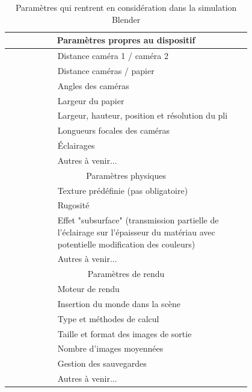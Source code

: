 \documentclass[a4paper, 11pt]{article}
\begin{document}
		\begin{table}
			\begin{tabular}{|r @{$\quad\rightarrow\quad$} p{0.8\linewidth}|}
				\hline
				\multicolumn{2}{|c|}{Paramètres propres au dispositif}  \\ \hline
				& Distance caméra 1 / caméra 2 \\
				& Distance caméras / papier \\
				& Angles des caméras \\
				& Largeur du papier \\
				& Largeur, hauteur, position et résolution du pli \\
				& Longueurs focales des caméras \\
				& \'Eclairages \\
				& Autres à venir... \\ \hline
				\multicolumn{2}{|c|}{Paramètres physiques} \\ \hline
				& Texture prédéfinie (pas obligatoire) \\
				& Rugosité \\
				& Effet "subsurface" (transmission partielle de l'éclairage sur l'épaisseur du matériau avec potentielle modification des couleurs) \\
				& Autres à venir... \\ \hline
				\multicolumn{2}{|c|}{Paramètres de rendu} \\ \hline
				& Moteur de rendu \\
				& Insertion du monde dans la scène \\
				& Type et méthodes de calcul \\
				& Taille et format des images de sortie \\
				& Nombre d'images moyennées \\
				& Gestion des sauvegardes \\
				& Autres à venir... \\ \hline
			\end{tabular}
			\caption{\label{tab:parametres_blender}Paramètres qui rentrent en considération dans la simulation Blender}
		\end{table}
	
\end{document}
